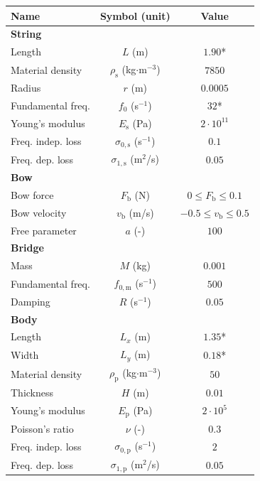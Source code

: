 \documentclass[dvipsnames, pdftex]{article}
\begin{document}
\begin{table}[t]\label{tab:parameters}
\small
\begin{center}
\begin{tabular}{|l|c|c|}
    \hline
    Name & Symbol (unit) & Value\\ \hline
    \multicolumn{3}{|l|}{\bf String}\\ \hline
    Length & $L$ (m) & $1.90$*\\
    Material density & $\rho_\text{s}$ (kg$\cdot$m$^{-3}$) & $7850$\\ 
    Radius & $r$ (m) & $0.0005$\\
    Fundamental freq. & $f_0$ (s$^{-1}$)& $32$*\\ 
    Young's modulus & $E_\text{s}$ (Pa) & $2\cdot 10^{11}$\\
    Freq. indep. loss & $\sigma_{0,\text{s}}$ (s$^{-1}$) & $0.1$\\ 
    Freq. dep. loss & $\sigma_{1,\text{s}}$ (m$^2$/s) & $0.05$\\ \hline
    \multicolumn{3}{|l|}{\bf Bow}\\ \hline
    Bow force & $F_\text{b}$ (N) & $0 \leq F_\text{b} \leq 0.1 $\\
    Bow velocity & $v_\text{b}$ (m/s) & $-0.5 \leq v_\text{b} \leq 0.5 $\\
    Free parameter & $a$ (-) & $100$\\\hline
    \multicolumn{3}{|l|}{\bf Bridge}\\ \hline
    Mass & $M$ (kg) & $0.001$\\ 
    Fundamental freq. & $f_{0,\text{m}}$ (s$^{-1}$) & $500$\\ 
    Damping & $R$ (s$^{-1}$)& $0.05$\\
    \hline
    \multicolumn{3}{|l|}{\bf Body}\\ \hline
    Length & $L_x$ (m)& $1.35$*\\ 
    Width & $L_y$ (m)& $0.18$*\\ 
    Material density & $\rho_\text{p}$ (kg$\cdot$m$^{-3}$)& $50$\\ 
    Thickness& $H$ (m) & $0.01$\\ 
    Young's modulus & $E_\text{p}$ (Pa) & $2\cdot 10^{5}$\\ 
    Poisson's ratio & $\nu$ (-)& $0.3$\\
    Freq. indep. loss & $\sigma_{0,\text{p}}$ (s$^{-1}$)& $2$\\
    Freq. dep. loss & $\sigma_{1,\text{p}}$ (m$^2$/s)& $0.05$\\

\end{tabular}
\end{center}
\end{table}
\end{document}
